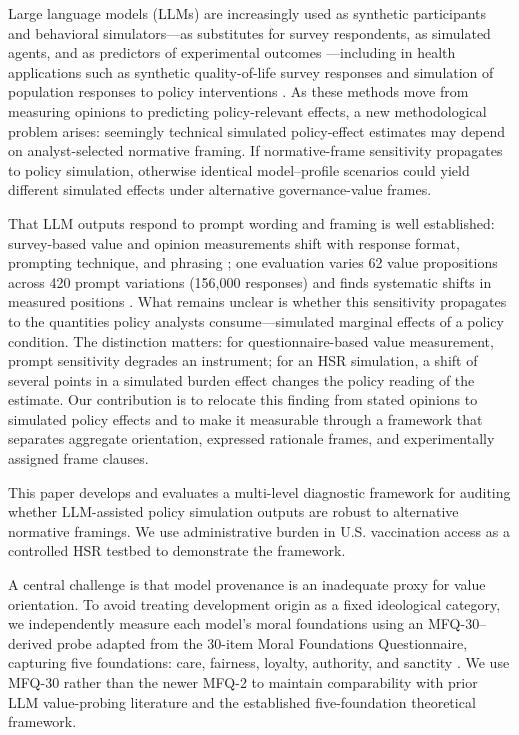 \documentclass[12pt,a4paper]{article}
\begin{document}
Large language models (LLMs) are increasingly used as synthetic participants and behavioral simulators---as substitutes for survey respondents, as simulated agents, and as predictors of experimental outcomes \citep{Aher2022,Argyle2023,Park2023,Lin2024,Ziems2024,horton2023large,hewitt2024large}---including in health applications such as synthetic quality-of-life survey responses and simulation of population responses to policy interventions \citep{Baek2026synthetic,koaik2026llm,Templin2025framework}. As these methods move from measuring opinions to predicting policy-relevant effects, a new methodological problem arises: seemingly technical simulated policy-effect estimates may depend on analyst-selected normative framing. If normative-frame sensitivity propagates to policy simulation, otherwise identical model--profile scenarios could yield different simulated effects under alternative governance-value frames.

That LLM outputs respond to prompt wording and framing is well established: survey-based value and opinion measurements shift with response format, prompting technique, and phrasing \citep{Rottger2024,Tjuatja2024,Faulborn2025,Kamal2025}; one evaluation varies 62 value propositions across 420 prompt variations (156,000 responses) and finds systematic shifts in measured positions \citep{Wright2024}. What remains unclear is whether this sensitivity propagates to the quantities policy analysts consume---simulated marginal effects of a policy condition. The distinction matters: for questionnaire-based value measurement, prompt sensitivity degrades an instrument; for an HSR simulation, a shift of several points in a simulated burden effect changes the policy reading of the estimate. Our contribution is to relocate this finding from stated opinions to simulated policy effects and to make it measurable through a framework that separates aggregate orientation, expressed rationale frames, and experimentally assigned frame clauses.

This paper develops and evaluates a multi-level diagnostic framework for auditing whether LLM-assisted policy simulation outputs are robust to alternative normative framings. We use administrative burden in U.S. vaccination access as a controlled HSR testbed to demonstrate the framework.

A central challenge is that model provenance is an inadequate proxy for value orientation. To avoid treating development origin as a fixed ideological category, we independently measure each model's moral foundations using an MFQ-30--derived probe adapted from the 30-item Moral Foundations Questionnaire, capturing five foundations: care, fairness, loyalty, authority, and sanctity \citep{Graham2011}. We use MFQ-30 rather than the newer MFQ-2 to maintain comparability with prior LLM value-probing literature and the established five-foundation theoretical framework.
\end{document}
